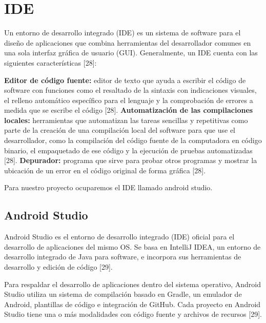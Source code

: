 
\section{IDE}

Un entorno de desarrollo integrado (IDE) es un sistema de software para el diseño de aplicaciones que combina herramientas del desarrollador comunes en una sola interfaz gráfica de usuario (GUI). Generalmente, un IDE cuenta con las siguientes características [28]:

\begin{list}{}%
    {\setlength{\leftmargin}{1cm}%
     \setlength{\rightmargin}{1cm}%
     \setlength{\itemsep}{0.5\baselineskip}%
     \setlength{\parsep}{0pt}}
     
    \item\relax
    \small
    \textbf{Editor de código fuente:} editor de texto que ayuda a escribir el código de software con funciones como el resaltado de la sintaxis con indicaciones visuales, el relleno automático específico para el lenguaje y la comprobación de errores a medida que se escribe el código [28].
    \textbf{Automatización de las compilaciones locales:} herramientas que automatizan las tareas sencillas y repetitivas como parte de la creación de una compilación local del software para que use el desarrollador, como la compilación del código fuente de la computadora en código binario, el empaquetado de ese código y la ejecución de pruebas automatizadas [28].
    \textbf{Depurador:} programa que sirve para probar otros programas y mostrar la ubicación de un error en el código original de forma gráfica [28].

\end{list}

Para nuestro proyecto ocuparemos el IDE llamado android studio.

\subsection{Android Studio}

\begin{list}{}%
    {\setlength{\leftmargin}{1cm}\setlength{\rightmargin}{1cm}}
    \item\relax
    \small

Android Studio es el entorno de desarrollo integrado (IDE) oficial para el desarrollo de aplicaciones del mismo OS. Se basa en IntelliJ IDEA, un entorno de desarrollo integrado de Java para software, e incorpora sus herramientas de desarrollo y edición de código [29].

Para respaldar el desarrollo de aplicaciones dentro del sistema operativo, Android Studio utiliza un sistema de compilación basado en Gradle, un emulador de Android, plantillas de código e integración de GitHub. Cada proyecto en Android Studio tiene una o más modalidades con código fuente y archivos de recursos [29].

\end{list}


